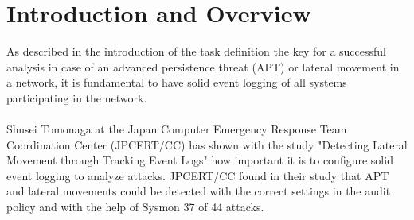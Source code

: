\section{Introduction and Overview}
As described in the introduction of the task definition the key for a successful analysis in case of an advanced persistence threat (APT) or lateral movement in a network, it is fundamental to have solid event logging of all systems participating in the network.
\\\\
Shusei Tomonaga at the Japan Computer Emergency Response Team Coordination Center (JPCERT/CC) has shown with the study "Detecting Lateral Movement through Tracking Event Logs" \cite{JPCERTDetectingLateralMovement} how important it is to configure solid event logging to analyze attacks. JPCERT/CC found in their study that APT and lateral movements could be detected with the correct settings in the audit policy and with the help of Sysmon 37 of 44 attacks.